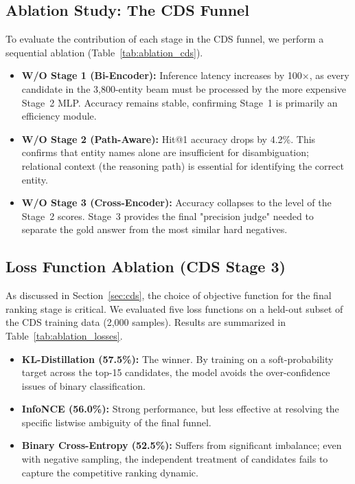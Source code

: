 \documentclass[11pt,a4paper]{article}
\makeatletter
\newcommand{\CDS}{\textsc{CDS}}
\newcommand{\HitOne}{Hit@1}
\makeatother
\begin{document}
\subsection{Ablation Study: The CDS Funnel}
To evaluate the contribution of each stage in the \CDS{} funnel, we perform a
sequential ablation (Table~\ref{tab:ablation_cds}).
\begin{itemize}
    \item \textbf{W/O Stage 1 (Bi-Encoder):} Inference latency increases by
          100$\times$, as every candidate in the 3,800-entity beam must be
          processed by the more expensive Stage~2 MLP. Accuracy remains stable,
          confirming Stage~1 is primarily an efficiency module.
    \item \textbf{W/O Stage 2 (Path-Aware):} \HitOne{} accuracy drops by 4.2\%.
          This confirms that entity names alone are insufficient for
          disambiguation; relational context (the reasoning path) is essential
          for identifying the correct entity.
    \item \textbf{W/O Stage 3 (Cross-Encoder):} Accuracy collapses to the level
          of the Stage~2 scores. Stage~3 provides the final "precision judge"
          needed to separate the gold answer from the most similar hard
          negatives.
\end{itemize}

\subsection{Loss Function Ablation (CDS Stage 3)}
As discussed in Section~\ref{sec:cds}, the choice of objective function for
the final ranking stage is critical. We evaluated five loss functions on a
held-out subset of the CDS training data (2,000 samples). Results are
summarized in Table~\ref{tab:ablation_losses}.
\begin{itemize}
    \item \textbf{KL-Distillation (57.5\%):} The winner. By training on a
          soft-probability target across the top-15 candidates, the model
          avoids the over-confidence issues of binary classification.
    \item \textbf{InfoNCE (56.0\%):} Strong performance, but less effective at
          resolving the specific listwise ambiguity of the final funnel.
    \item \textbf{Binary Cross-Entropy (52.5\%):} Suffers from significant
          imbalance; even with negative sampling, the independent treatment
          of candidates fails to capture the competitive ranking dynamic.
\end{itemize}
\end{document}
